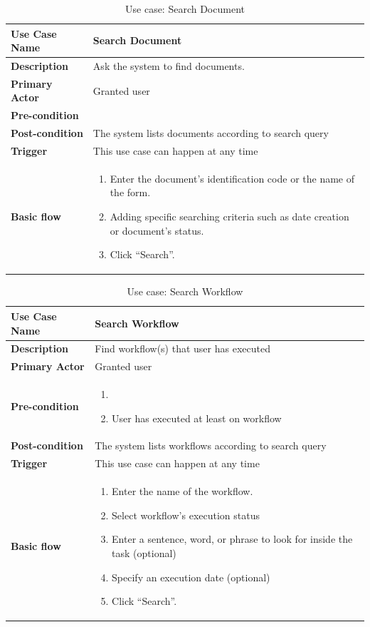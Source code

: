 \begin{table}
	\centering
	\caption{Use case: Search Document}
	\begin{tabular}{|l|L{9cm}|}
		\hline
		\textbf{Use Case Name} & Search Document \\
		\hline
		
		\textbf{Description} & Ask the system to find documents. \\
		\textbf{Primary Actor} & Granted user \\
		\textbf{Pre-condition} & \alreadylogin \\
		\textbf{Post-condition} & The system lists documents according to search query \\
		\textbf{Trigger} & This use case can happen at any time \\
		\textbf{Basic flow} & 
		\begin{enumerate}
			\item Enter the document's identification code or the name of the form.
			\item Adding specific searching criteria such as date creation or document's status.
			\item Click \enquote{Search}.
		\end{enumerate} \\
		\hline
	\end{tabular}
\end{table}

\begin{table}
	\centering
	\caption{Use case: Search Workflow}
	\begin{tabular}{|l|L{9cm}|}
		\hline
		\textbf{Use Case Name} & Search Workflow \\
		\hline
		
		\textbf{Description} & Find workflow(s) that user has executed  \\
		\textbf{Primary Actor} & Granted user \\
		\textbf{Pre-condition} & 
		\begin{enumerate}
			\item \alreadylogin
			\item User has executed at least on workflow
		\end{enumerate} \\
		\textbf{Post-condition} & The system lists workflows according to search query \\
		\textbf{Trigger} & This use case can happen at any time \\
		\textbf{Basic flow} & 
		\begin{enumerate}
			\item Enter the name of the workflow.
			\item Select workflow's execution status
			\item Enter a sentence, word, or phrase to look for inside the task (optional)
			\item Specify an execution date (optional)
			\item Click \enquote{Search}.
		\end{enumerate} \\
		\hline
	\end{tabular}
\end{table}

